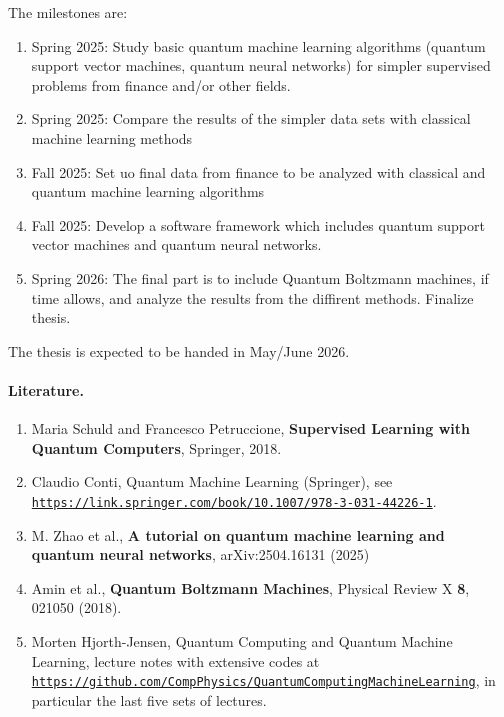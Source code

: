 \documentclass[%
oneside,                 %
final,                   %
10pt]{article}
\begin{document}
\noindent
The milestones are:
\begin{enumerate}
\item Spring 2025: Study basic quantum machine learning algorithms (quantum support vector machines, quantum neural networks) for simpler supervised problems from finance and/or other fields.

\item Spring 2025: Compare the results of the simpler data sets with classical machine learning methods

\item Fall 2025: Set uo final data from finance to be analyzed with classical and quantum machine learning algorithms

\item Fall 2025: Develop a software framework which includes quantum support vector machines and quantum neural networks.

\item Spring 2026: The final part is to include Quantum Boltzmann machines, if time allows,  and analyze the results from the diffirent methods. Finalize thesis. 
\end{enumerate}

\noindent
The thesis is expected to be handed in May/June 2026.

\paragraph{Literature.}
\begin{enumerate}


\item Maria Schuld and Francesco Petruccione, \textbf{Supervised Learning with Quantum Computers}, Springer, 2018.

\item Claudio Conti, Quantum Machine Learning (Springer), see \href{{https://link.springer.com/book/10.1007/978-3-031-44226-1}}{\nolinkurl{https://link.springer.com/book/10.1007/978-3-031-44226-1}}.

\item M. Zhao et al., \textbf{A tutorial on quantum machine learning and quantum neural networks}, arXiv:2504.16131 (2025) 
\item Amin et al., \textbf{Quantum Boltzmann Machines}, Physical Review X \textbf{8}, 021050 (2018).

\item Morten Hjorth-Jensen, Quantum Computing and Quantum Machine Learning, lecture notes with extensive codes at \href{{https://github.com/CompPhysics/QuantumComputingMachineLearning}}{\nolinkurl{https://github.com/CompPhysics/QuantumComputingMachineLearning}}, in particular the last five sets of lectures.
\end{enumerate}
\end{document}
